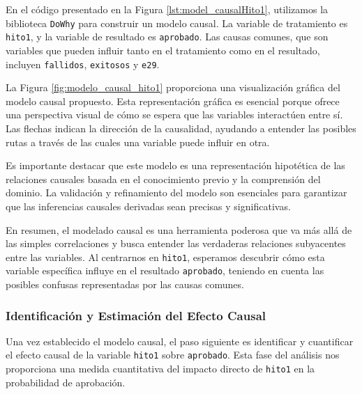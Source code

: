 En el código presentado en la Figura \ref{lst:model_causalHito1}, utilizamos la biblioteca \texttt{DoWhy} para construir un modelo causal. La variable de tratamiento es \texttt{hito1}, y la variable de resultado es \texttt{aprobado}. Las causas comunes, que son variables que pueden influir tanto en el tratamiento como en el resultado, incluyen \texttt{fallidos}, \texttt{exitosos} y \texttt{e29}.

La Figura \ref{fig:modelo_causal_hito1} proporciona una visualización gráfica del modelo causal propuesto. Esta representación gráfica es esencial porque ofrece una perspectiva visual de cómo se espera que las variables interactúen entre sí. Las flechas indican la dirección de la causalidad, ayudando a entender las posibles rutas a través de las cuales una variable puede influir en otra.

Es importante destacar que este modelo es una representación hipotética de las relaciones causales basada en el conocimiento previo y la comprensión del dominio. La validación y refinamiento del modelo son esenciales para garantizar que las inferencias causales derivadas sean precisas y significativas.

En resumen, el modelado causal es una herramienta poderosa que va más allá de las simples correlaciones y busca entender las verdaderas relaciones subyacentes entre las variables. Al centrarnos en \texttt{hito1}, esperamos descubrir cómo esta variable específica influye en el resultado \texttt{aprobado}, teniendo en cuenta las posibles confusas representadas por las causas comunes.


\subsubsection{Identificación y Estimación del Efecto Causal}

Una vez establecido el modelo causal, el paso siguiente es identificar y cuantificar el efecto causal de la variable \texttt{hito1} sobre \texttt{aprobado}. Esta fase del análisis nos proporciona una medida cuantitativa del impacto directo de \texttt{hito1} en la probabilidad de aprobación.


